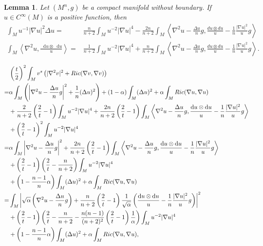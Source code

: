 \documentclass[10pt,a4paper]{amsart}
\newtheorem{lemma}{Lemma}
\newcommand{\dd}{\mathop{}\!\mathrm{d}}%
\begin{document}
    \begin{lemma}\label{lem. integral identity}
        Let $(M^n,g)$ be a compact manifold without boundary. If $u\in C^{\infty}(M)$ is a positive function, then
        \begin{align*}
            \int_M u^{-1}|\nabla u|^2\Delta u
            =&\frac{n}{n+2}\int_M u^{-2}|\nabla u|^4
            -\frac{2n}{n+2}\int_M 
            \left\langle\nabla^2 u-\frac{\Delta u}{n}g,\frac{du\otimes du}{u}-\frac{1}{n}\frac{|\nabla u|^2}{u}g\right\rangle\\
            \int_M \left\langle
            \nabla^2u,\frac{\dd u\otimes \dd u}{u}
            \right\rangle
            =&\frac{1}{n+2}\int_M u^{-2}|\nabla u|^4
            +\frac{n}{n+2}\int_M \left\langle\nabla^2 u-\frac{\Delta u}{n}g,\frac{du\otimes du}{u}-\frac{1}{n}\frac{|\nabla u|^2}{u}g\right\rangle.
        \end{align*}
    \end{lemma}

     \begin{align}
      & \left(\frac{t}{2}\right)^2
     \int_{M} v^s
     \left(|\nabla^2 v|^2
     +Ric(\nabla v,\nabla v)
     \right)\notag\\=&\alpha
     \int_M \left(\left|\nabla^2 u-\frac{\Delta u}{n}g\right|^2+\frac{1}{n}(\Delta u)^2\right)
     +(1-\alpha)\int_M (\Delta u)^2
     +\alpha\int_M Ric(\nabla u,\nabla u)\notag
     \\
     &+\frac{2}{n+2}\left(\frac{2}{t}-1\right)
     \int_M u^{-2}|\nabla u|^4
     +\frac{2n}{n+2}\left(\frac{2}{t}-1\right)
     \int_M \left\langle\nabla^2 u-\frac{\Delta u}{n}g,\frac{\dd u\otimes \dd u}{u}-\frac{1}{n}\frac{|\nabla u|^2}{u}g\right\rangle\notag\\
     &+\left(\frac{2}{t}-1\right)^2
     \int_M u^{-2}|\nabla u|^4\notag\\
     =&\alpha\int_M \left|\nabla^2 u-\frac{\Delta u}{n}g\right|^2
     +\frac{2n}{n+2}\left(\frac{2}{t}-1\right)
     \int_M \left\langle\nabla^2 u-\frac{\Delta u}{n}g,\frac{\dd u\otimes \dd u}{u}-\frac{1}{n}\frac{|\nabla u|^2}{u}g\right\rangle\notag\\
     &+\left(\frac{2}{t}-1\right)
     \left(\frac{2}{t}-\frac{n}{n+2}\right)
     \int_M u^{-2}|\nabla u|^4\notag\\
     &+\left(1-\frac{n-1}{n}\alpha\right)\int_M (\Delta u)^2
     +\alpha\int_M Ric(\nabla u,\nabla u)\notag\\
     =&\int_M \left|\sqrt{\alpha}
     \left(\nabla^2 u-\frac{\Delta u}{n}g\right)
     +\frac{n}{n+2}
     \left(\frac{2}{t}-1\right)
     \frac{1}{\sqrt{\alpha}}
     \left(
     \frac{\dd u\otimes \dd u}{u}-\frac{1}{n}\frac{|\nabla u|^2}{u}g
     \right)
     \right|^2\notag\\
     &+\left(\frac{2}{t}-1\right)
     \left(
     \frac{2}{t}-\frac{n}{n+2}
     -\frac{n(n-1)}{(n+2)^2}
     \left(\frac{2}{t}-1\right)
     \frac{1}{\alpha}
     \right)\int_M u^{-2}|\nabla u|^4\notag\\
     &+\left(1-\frac{n-1}{n}\alpha\right)\int_M (\Delta u)^2
     +\alpha\int_M Ric(\nabla u,\nabla u),
     \label{eq. proof}
 \end{align}
\end{document}
